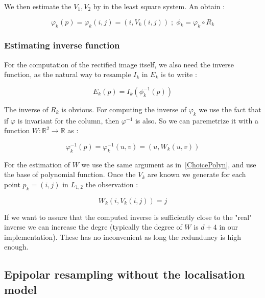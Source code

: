 \documentclass{ipol}
\newcommand{\RR}{\ensuremath{\mathbb{R}}}
\begin{document}
We then estimate the $V_1,V_2$ by in the least square system. An obtain :

\begin{equation}
  \varphi_k(p) = \varphi_k(i,j) = (i,V_k(i,j))  \;;\;    \phi_k =  \varphi_k  \circ R_k 
\end{equation}

\subsubsection{Estimating inverse function}

For the computation of the rectified image itself, we also need the inverse function, 
as the natural way to resample  $I_k$ in $E_k$ is to write :

\begin{equation}
  E_k(p) = I_k(\phi^{-1}_k(p))
\end{equation}

The inverse of $R_k$ is obvious. For computing the inverse of $\varphi_k$  we
use the fact that if $\varphi$ is invariant for the column, then $\varphi^{-1}$ is also.
So we can paremetrize it with a function $W : \RR^2 \rightarrow \RR$ as :

\begin{equation}
  \varphi^{-1}_k(p) = \varphi^{-1}_k(u,v) = (u,W_k(u,v))  
\end{equation}


For the estimation of $W$ we use the same argument as in~\ref{ChoicePolyn}, and
use the base of polynomial function. Once the $V_k$ are known we generate
for each point $p_k=(i,j)$ in $L_{1,2}$ the observation :

\begin{equation}
   W_k(i,V_k(i,j))  = j \label{InverseEpip}
\end{equation}

If we want to assure that the computed inverse is sufficiently close
to the "real" inverse we can increase the degre (typically the degree of $W$
is $d+4$ in our implementation). These has no inconvenient as long the redunduncy
is high enough.


\subsection{Epipolar resampling without the localisation model}
\end{document}
